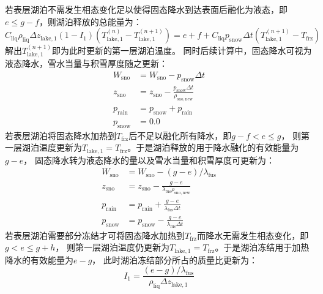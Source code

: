 若表层湖泊不需发生相态变化足以使得固态降水到达表面后融化为液态，即$e\leqslant g-f$，则湖泊释放的总能量为：
\begin{equation}
  C_{\mathrm{liq}} \rho_{\mathrm{liq}} \Delta z_{\mathrm{lake, 1}}\left(1-I_{1}\right)\left(T_{\mathrm{lake, 1}}^{(n)}-T_{\mathrm{lake, 1}}^{(n+1)}\right)=
  e+f+C_{\mathrm{liq}} p_{\mathrm {snow}} \Delta t\left(T_{\mathrm{lake, 1}}^{(n+1)}-T_{\mathrm {frz}}\right)
\end{equation}
解出$T_{\mathrm{lake,1}}^{\left(n+1\right)}$即为此时更新的第一层湖泊温度。
同时后续计算中，固态降水可视为液态降水，雪水当量与积雪厚度随之更新：
\begin{equation}
  \begin{aligned}
    W_{\mathrm{sno}} &= W_{\mathrm{sno}}-p_{\mathrm {snow}} \Delta t \\
    z_{\mathrm{sno}} &= z_{\mathrm{sno}}-\frac{p_{\mathrm {snow}}  \Delta t}{\rho_{\mathrm{sno,new}}} \\
    p_{\mathrm {rain}}  &= p_{\mathrm {snow}}  + p_{\mathrm {rain}}  \\
    p_{\mathrm {snow}}  &= 0.0
  \end{aligned}
\end{equation}
若表层湖泊将固态降水加热到$T_{\mathrm {frz}} $后不足以融化所有降水，即$g-f<e\leqslant g$，
则第一层湖泊温度更新为$T_{\mathrm{lake,1}}=T_{\mathrm {frz}} $。于是湖泊释放的用于降水融化的有效能量为$g-e$，
固态降水转为液态降水的量以及雪水当量和积雪厚度可更新为：
\begin{equation}
  \begin{aligned}
    W_{\mathrm{sno}} &= W_{\mathrm{sno}}-(g-e) / \lambda_{\mathrm {fus}} \\
    z_{\mathrm{sno}} &= z_{\mathrm{sno}}-\frac{g-e}{\lambda_{\mathrm {fus}}  \rho_{\mathrm{sno,new}}} \\
    p_{\mathrm {rain}} &= p_{\mathrm {rain}}+\frac{g-e}{\lambda_{\mathrm {fus}}  \Delta t} \\
    p_{\mathrm {snow}} &= p_{\mathrm {snow}}-\frac{g-e}{\lambda_{\mathrm {fus}}  \Delta t}
  \end{aligned}
\end{equation}
若表层湖泊需要部分冻结才可将固态降水加热到$T_{\mathrm {frz}} $而降水无需发生相态变化，即$g<e\leqslant g+h$，
则第一层湖泊温度仍更新为$T_{\mathrm{lake,1}}=T_{\mathrm {frz}} $。于是湖泊冻结用于加热降水的有效能量为$e-g$，
此时湖泊冻结部分所占的质量比更新为：
\begin{equation}
  I_{1}=\frac{(e-g) / \lambda_{\mathrm {fus}}}{\rho_{\mathrm{liq}} \Delta z_{\mathrm{lake, 1}}}
\end{equation}

